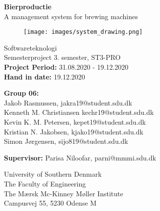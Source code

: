 \begin{titlepage}
\begin{center}
{ \LARGE \bfseries Bierproductie \\[0.4cm]}
A management system for brewing machines
\begin{figure}[H]
\centering 
\texttt{[image: images/system\_drawing.png]}
\label{figure:bierproductie_system}
\end{figure}

Softwareteknologi\\
\vspace{2mm}
Semesterproject 3. semester, ST3-PRO\\
\vspace{2mm}
\textbf{Project Period:} 31.08.2020 - 19.12.2020 \\
\vspace{2mm}
\textbf{Hand in date:} 19.12.2020 \\

\vspace{7mm}

\textbf{Group 06:} \\
\vspace{2mm}
Jakob Rasmussen, jakra19@student.sdu.dk \\
\vspace{2mm}
Kenneth M. Christiansen kechr19@student.sdu.dk \\
\vspace{2mm}
Kevin K. M. Petersen, kepet19@student.sdu.dk \\
\vspace{2mm}
Kristian N. Jakobsen, kjako19@student.sdu.dk \\
\vspace{2mm}
Simon Jørgensen, sijo819@student.sdu.dk \\

\vspace{7mm}

\textbf{Supervisor:} Parisa Niloofar, parni@mmmi.sdu.dk \\

\vfill

University of Southern Denmark \\
The Faculty of Engineering \\
The Mærsk Mc-Kinney Møller Institute \\
Campusvej 55, 5230 Odense M 

\end{center}
\end{titlepage}